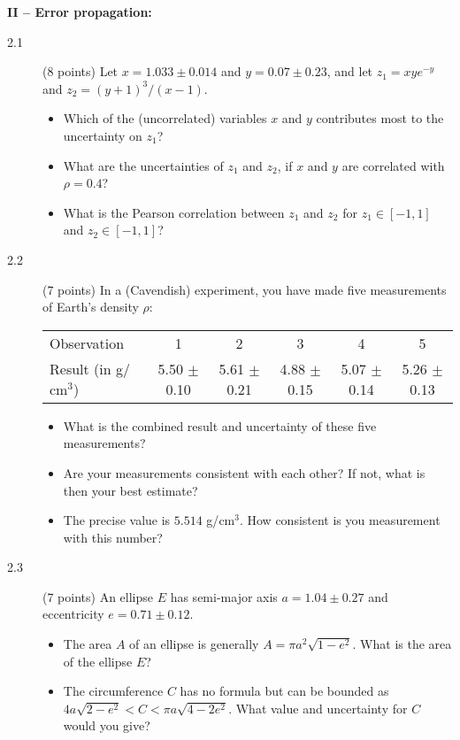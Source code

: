 \documentclass[11pt]{article}
\begin{document}
\vspace{2ex}
\noindent
{\bf II -- Error propagation:}
\begin{description}
\item[2.1] (8 points)
  Let $x = 1.033 \pm 0.014$ and $y = 0.07 \pm 0.23$, and let $z_1 = xy e^{-y}$ and $z_2 = (y+1)^{3}/(x \!-\! 1)$.
  \vspace*{-1ex}
  \begin{itemize}
    \item Which of the (uncorrelated) variables $x$ and $y$ contributes most to the uncertainty on $z_1$?
    \item What are the uncertainties of $z_1$ and $z_2$, if $x$ and $y$ are correlated with $\rho = 0.4$?
    \item What is the Pearson correlation between $z_1$ and $z_2$ for $z_1 \in [-1,1]$ and $z_2 \in [-1,1]$?
  \end{itemize}
%
\item[2.2] (7 points)
  In a (Cavendish) experiment, you have made five measurements of Earth's density $\rho$:\\[-1ex]
  \vspace*{-3ex}
  \begin{center}
  \begin{tabular}{lccccc}
    \hline
    Observation                   &1                &2                 &3                &4                &5\\
    Result (in g/$\mbox{cm}^3$)   &5.50 $\pm$ 0.10  &5.61 $\pm$ 0.21   &4.88 $\pm$ 0.15  &5.07 $\pm$ 0.14  &5.26 $\pm$ 0.13\\
    \hline
  \end{tabular}
  \end{center}
  \vspace*{-3ex}
  \begin{itemize}
    \item What is the combined result and uncertainty of these five measurements?
    \item Are your measurements consistent with each other? If not, what is then your best estimate?
    \item The precise value is $5.514$ g/$\mbox{cm}^3$. How consistent is you measurement with this number?
  \end{itemize}
%
\item[2.3] (7 points)
  An ellipse $E$ has semi-major axis $a = 1.04 \pm 0.27$ and eccentricity $e = 0.71 \pm 0.12$.
  \vspace*{-1ex}
  \begin{itemize}
    \item The area $A$ of an ellipse is generally $A = \pi a^2 \sqrt{1 - e^2}$. What is the area of the ellipse $E$?
    \item The circumference $C$ has no formula but can be bounded as $4a \sqrt{2-e^2} < C < \pi a \sqrt{4-2e^2}$.
      What value and uncertainty for $C$ would you give?
  \end{itemize}
\end{description}
\end{document}
